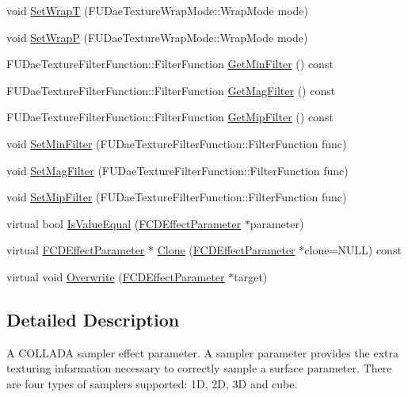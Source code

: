 \begin{DoxyCompactItemize}
\item 
void \hyperlink{classFCDEffectParameterSampler_ad0bfbd28ab6eaa0418e7132854c8f2cd}{SetWrapT} (FUDaeTextureWrapMode::WrapMode mode)
\item 
void \hyperlink{classFCDEffectParameterSampler_a02d7b529fde6695a19ff46b08da4a19c}{SetWrapP} (FUDaeTextureWrapMode::WrapMode mode)
\item 
FUDaeTextureFilterFunction::FilterFunction \hyperlink{classFCDEffectParameterSampler_aaea04017be7daae510dcc8542dce7d01}{GetMinFilter} () const 
\item 
FUDaeTextureFilterFunction::FilterFunction \hyperlink{classFCDEffectParameterSampler_a289f5a2811094a7673ab7ace87405025}{GetMagFilter} () const 
\item 
FUDaeTextureFilterFunction::FilterFunction \hyperlink{classFCDEffectParameterSampler_a90eb9b969aeb0bd4da0c1964c8d0252d}{GetMipFilter} () const 
\item 
void \hyperlink{classFCDEffectParameterSampler_ac109ce64fbad3136acf24bf15636316d}{SetMinFilter} (FUDaeTextureFilterFunction::FilterFunction func)
\item 
void \hyperlink{classFCDEffectParameterSampler_a28fef01829ddba5f4146335e1982e8e0}{SetMagFilter} (FUDaeTextureFilterFunction::FilterFunction func)
\item 
void \hyperlink{classFCDEffectParameterSampler_ae0cd8598da4f351c0c526eb5c72530e6}{SetMipFilter} (FUDaeTextureFilterFunction::FilterFunction func)
\item 
virtual bool \hyperlink{classFCDEffectParameterSampler_ad167b41465766bed31b83cc76f6866c4}{IsValueEqual} (\hyperlink{classFCDEffectParameter}{FCDEffectParameter} $\ast$parameter)
\item 
virtual \hyperlink{classFCDEffectParameter}{FCDEffectParameter} $\ast$ \hyperlink{classFCDEffectParameterSampler_af72a0f9e9514fca46bc9996ed872eb01}{Clone} (\hyperlink{classFCDEffectParameter}{FCDEffectParameter} $\ast$clone=NULL) const 
\item 
virtual void \hyperlink{classFCDEffectParameterSampler_a2c562fb4058a2a10a0f9545c3a8eb43a}{Overwrite} (\hyperlink{classFCDEffectParameter}{FCDEffectParameter} $\ast$target)
\end{DoxyCompactItemize}


\subsection{Detailed Description}
A COLLADA sampler effect parameter. A sampler parameter provides the extra texturing information necessary to correctly sample a surface parameter. There are four types of samplers supported: 1D, 2D, 3D and cube. 

